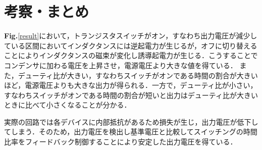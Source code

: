 \documentclass[a4paper,12pt]{jarticle}
\begin{document}
\section{考察・まとめ}
%
{\bf Fig.}\ref{result}において，トランジスタスイッチがオン，すなわち出力電圧が減少している区間においてインダクタンスには逆起電力が生じるが，オフに切り替えることによりインダクタンスの磁束が変化し誘導起電力が生じる．こうすることでコンデンサに加わる電圧を上昇させ，電源電圧より大きな値を得ている．
また，デューティ比が大きい，すなわちスイッチがオンである時間の割合が大きいほど，電源電圧よりも大きな出力が得られる．一方で，デューティ比が小さい，すなわちスイッチがオンである時間の割合が短いと出力はデューティ比が大きいときに比べて小さくなることが分かる．

実際の回路では各デバイスに内部抵抗があるため損失が生じ，出力電圧が低下してしまう．そのため，出力電圧を検出し基準電圧と比較してスイッチングの時間比率をフィードバック制御することにより安定した出力電圧を得ている\cite{3}．
\end{document}
